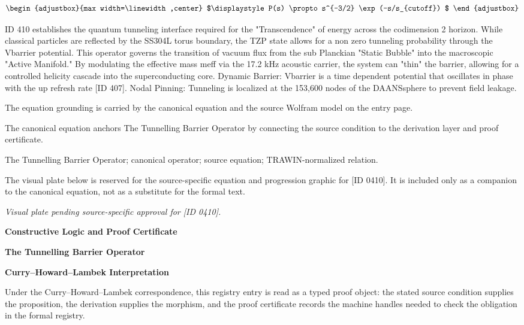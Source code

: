 \[
\begin{adjustbox}{max width=\linewidth,center}
$\displaystyle
P(s) \propto s^{-3/2} \exp(-s/s_{cutoff})
$
\end{adjustbox}
\]

ID 410 establishes the quantum tunneling interface required for the "Transcendence" of energy across the codimension 2 horizon. While classical particles are reflected by the SS304L torus boundary, the TZP state allows for a non zero tunneling probability through the Vbarrier potential. This operator governs the transition of vacuum flux from the sub Planckian "Static Bubble" into the macroscopic "Active Manifold." By modulating the effective mass meff via the 17.2 kHz acoustic carrier, the system can "thin" the barrier, allowing for a controlled helicity cascade into the superconducting core. Dynamic Barrier: Vbarrier is a time dependent potential that oscillates in phase with the up refresh rate [ID 407]. Nodal Pinning: Tunneling is localized at the 153,600 nodes of the DAANSsphere to prevent field leakage.

The equation grounding is carried by the canonical equation and the source Wolfram model on the entry page.

The canonical equation anchors The Tunnelling Barrier Operator by connecting the source condition to the derivation layer and proof certificate.

The Tunnelling Barrier Operator; canonical operator; source equation; TRAWIN-normalized relation.
\endgroup

\begingroup\footnotesize\sloppy
The visual plate below is reserved for the source-specific equation and progression graphic for [ID 0410]. It is included only as a companion to the canonical equation, not as a substitute for the formal text.
\par\endgroup
\begingroup\footnotesize\itshape
Visual plate pending source-specific approval for [ID 0410].
\par\endgroup

\clearpage
\begingroup\tzpsupportsetup
\noindent\textbf{\fontsize{10.8pt}{12.8pt}\selectfont [ID 0410] Constructive Logic and Proof Certificate}\par
\noindent\textbf{\fontsize{10pt}{12pt}\selectfont The Tunnelling Barrier Operator}\par
\vspace{0.45em}
\begingroup
\footnotesize
\setlength{\parskip}{0.22em}
\setlength{\parindent}{0pt}
\noindent\textbf{Curry--Howard--Lambek Interpretation}\par
Under the Curry--Howard--Lambek correspondence, this registry entry is read as a typed proof
object: the stated source condition supplies the proposition, the derivation supplies the
morphism, and the proof certificate records the machine handles needed to check the obligation
in the formal registry.

